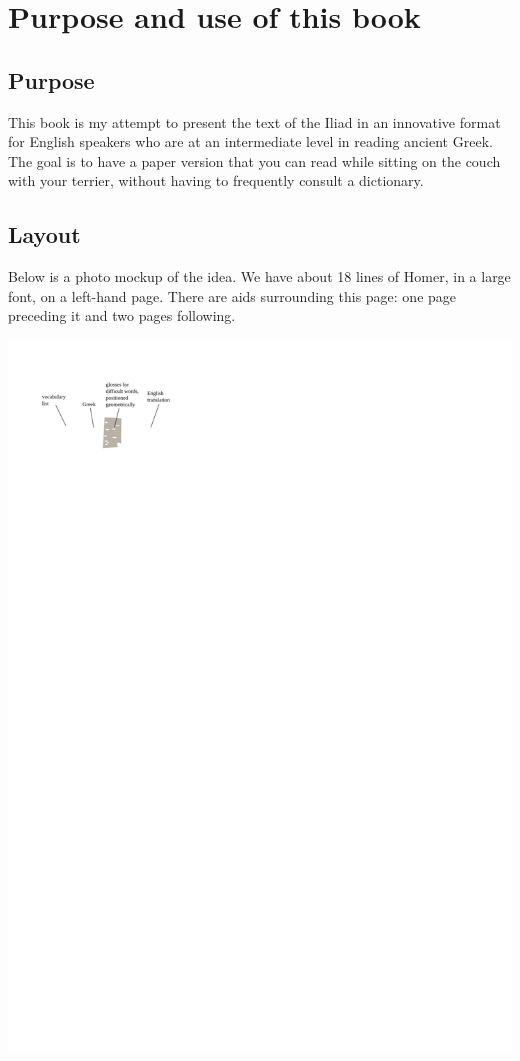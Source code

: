 \chapter*{Purpose and use of this book}

{\small

\section*{Purpose}

This book is my attempt to present the text of the Iliad in an innovative format
for English speakers who are at an intermediate level in reading ancient Greek.
The goal is to have a paper version that you can read while sitting on the couch
with your terrier, without having to frequently consult a dictionary.

\section*{Layout}

Below is a photo mockup of the
idea. We have about 18 lines of Homer, in a large font, on a left-hand
page. There are aids surrounding this page: one page preceding it and
two pages following.

\includegraphics{figs/manual}

}
